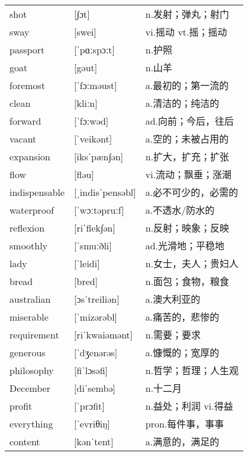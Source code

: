 \documentclass[a4paper]{article}
\begin{document}
\section{}
\begin{tabular}{l l l}

shot & [∫ɔt] & n.发射；弹丸；射门 \\
sway & [swei] & vi.摇动 vt.摇；摇动 \\
passport & [ˈpɑːspɔːt] & n.护照 \\
goat & [gəut] & n.山羊 \\
foremost & [ˈfɔːməust] & a.最初的；第一流的 \\
clean & [kliːn] & a.清洁的；纯洁的 \\
forward & [ˈfɔːwəd] & ad.向前；今后，往后 \\
vacant & [ˈveikənt] & a.空的；未被占用的 \\
expansion & [iksˈpæn∫ən] & n.扩大，扩充；扩张 \\
flow & [fləu] & vi.流动；飘垂；涨潮 \\
indispensable & [ˌindisˈpensəbl] & a.必不可少的，必需的 \\
waterproof & [ˈwɔːtəpruːf] & a.不透水/防水的 \\
reflexion & [riˈflek∫ən] & n.反射；映象；反映 \\
smoothly & [ˈsmuːðli] & ad.光滑地；平稳地 \\
lady & [ˈleidi] & n.女士，夫人；贵妇人 \\
bread & [bred] & n.面包；食物，粮食 \\
australian & [ɔsˈtreiliən] & a.澳大利亚的 \\
miserable & [ˈmizərəbl] & a.痛苦的，悲惨的 \\
requirement & [riˈkwaiəmənt] & n.需要；要求 \\
generous & [ˈdʒenərəs] & a.慷慨的；宽厚的 \\
philosophy & [fiˈlɔsəfi] & n.哲学；哲理；人生观 \\
December & [diˈsembə] & n.十二月 \\
profit & [ˈprɔfit] & n.益处；利润 vi.得益 \\
everything & [ˈevriθiŋ] & pron.每件事，事事 \\
content & [kənˈtent] & a.满意的，满足的 \\

\end{tabular}
\end{document}
